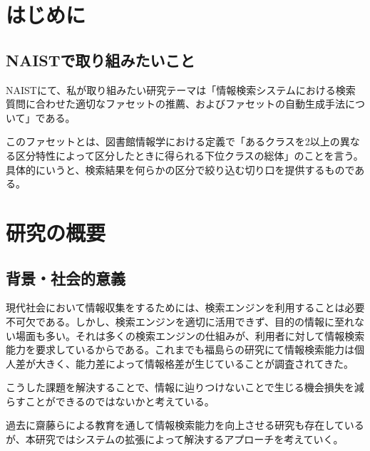 \documentclass[a4j,11pt, twocolumn]{jarticle}
\begin{document}
\section{はじめに}
\subsection{NAISTで取り組みたいこと}
NAISTにて、私が取り組みたい研究テーマは「情報検索システムにおける検索質問に合わせた適切なファセットの推薦、およびファセットの自動生成手法について」である。

このファセットとは、図書館情報学における定義で「あるクラスを2以上の異なる区分特性によって区分したときに得られる下位クラスの総体\cite{libdic}」のことを言う。具体的にいうと、検索結果を何らかの区分で絞り込む切り口を提供するものである。
\section{研究の概要}
\subsection{背景・社会的意義}
 現代社会において情報収集をするためには、検索エンジンを利用することは必要不可欠である。しかし、検索エンジンを適切に活用できず、目的の情報に至れない場面も多い。それは多くの検索エンジンの仕組みが、利用者に対して情報検索能力を要求しているからである。これまでも福島らの研究にて情報検索能力は個人差が大きく、能力差によって情報格差が生じていることが調査されてきた\cite{fukushima}。

 こうした課題を解決することで、情報に辿りつけないことで生じる機会損失を減らすことができるのではないかと考えている。
 
 過去に齋藤らによる教育を通して情報検索能力を向上させる研究\cite{saito}も存在しているが、本研究ではシステムの拡張によって解決するアプローチを考えていく。
\end{document}
